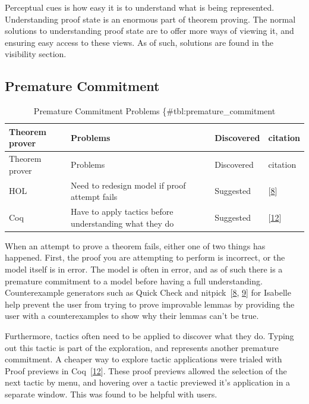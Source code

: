 \documentclass[
]{article}
\begin{document}
Perceptual cues is how easy it is to understand what is being
represented. Understanding proof state is an enormous part of theorem
proving. The normal solutions to understanding proof state are to offer
more ways of viewing it, and ensuring easy access to these views. As of
such, solutions are found in the visibility section.

\hypertarget{premature-commitment-1}{%
\subsection{Premature Commitment}\label{premature-commitment-1}}

\begin{longtable}[]{@{}llll@{}}
\caption{Premature Commitment Problems
\{\#tbl:premature\_commitment}\tabularnewline
\toprule
Theorem prover & Problems & Discovered & citation \\
\midrule
\endfirsthead
\toprule
Theorem prover & Problems & Discovered & citation \\
\midrule
\endhead
HOL & Need to redesign model if proof attempt fails & Suggested &
{[}\protect\hyperlink{ref-beckert_usability_2015}{8}{]} \\
Coq & Have to apply tactics before understanding what they do &
Suggested & {[}\protect\hyperlink{ref-berman_development_2014}{12}{]} \\
\bottomrule
\end{longtable}

When an attempt to prove a theorem fails, either one of two things has
happened. First, the proof you are attempting to perform is incorrect,
or the model itself is in error. The model is often in error, and as of
such there is a premature commitment to a model before having a full
understanding. Counterexample generators such as Quick Check and
nitpick~{[}\protect\hyperlink{ref-beckert_usability_2015}{8},
\protect\hyperlink{ref-beckert_interaction_2017}{9}{]} for Isabelle help
prevent the user from trying to prove improvable lemmas by providing the
user with a counterexamples to show why their lemmas can't be true.

Furthermore, tactics often need to be applied to discover what they do.
Typing out this tactic is part of the exploration, and represents
another premature commitment. A cheaper way to explore tactic
applications were trialed with Proof previews in
Coq~{[}\protect\hyperlink{ref-berman_development_2014}{12}{]}. These
proof previews allowed the selection of the next tactic by menu, and
hovering over a tactic previewed it's application in a separate window.
This was found to be helpful with users.
\end{document}

